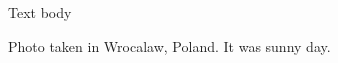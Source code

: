 \documentclass{article}
\begin{document}

    \newpage

    Text body

    Photo taken in Wrocalaw, Poland. It was sunny day.
\end{document}
